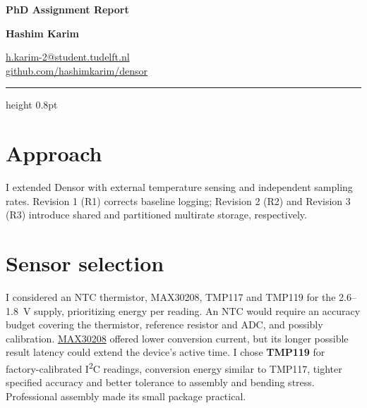 \documentclass[a4paper]{article}
\begin{document}
\color{ink}
\fontsize{10.2}{12.2}\selectfont
\begin{minipage}[t]{0.60\linewidth}
\vspace{0pt}
{\fontsize{25}{28}\selectfont\bfseries PhD Assignment Report\par}
\end{minipage}\hfill
\begin{minipage}[t]{0.38\linewidth}
\vspace{0pt}
\raggedleft
{\fontsize{11}{13}\selectfont\bfseries Hashim Karim\par}
{\fontsize{9.3}{12}\selectfont
\href{mailto:h.karim-2@student.tudelft.nl}{h.karim-2@student.tudelft.nl}\\
\href{https://github.com/hashimkarim/densor}{github.com/hashimkarim/densor}\par}
\end{minipage}
\par\vspace{5pt}
{\color{linkblue}\hrule height 0.8pt}
\vspace{2pt}

\section*{Approach}
I extended Densor with external temperature sensing and independent sampling
rates. Revision 1 (R1) corrects baseline logging; Revision 2 (R2) and
Revision 3 (R3) introduce shared and partitioned multirate storage, respectively.

\section*{Sensor selection}
I considered an NTC thermistor, MAX30208, TMP117 and TMP119 for the 2.6--1.8~V
supply, prioritizing energy per reading. An NTC would require an accuracy budget
covering the thermistor, reference resistor and ADC, and possibly calibration.
\href{https://www.analog.com/media/en/technical-documentation/data-sheets/max30208.pdf\#page=8}{MAX30208}
offered lower conversion current, but its longer possible result latency could
extend the device's active time. I chose \textbf{TMP119} for factory-calibrated
I\textsuperscript{2}C readings, conversion energy similar to TMP117, tighter
specified accuracy and better tolerance to assembly and bending stress.
Professional assembly made its small package practical.
\end{document}
